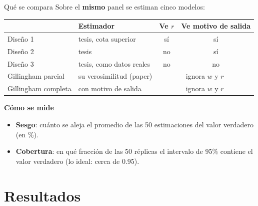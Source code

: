 \documentclass[aspectratio=169,11pt]{beamer}
\begin{document}
\begin{frame}{Qué se compara}
  Sobre el \textbf{mismo} panel se estiman cinco modelos:
  \begin{center}
  \begin{tabular}{llcc}
    \toprule
    & Estimador & Ve $r$ & Ve motivo de salida\\
    \midrule
    Diseño 1 & tesis, cota superior & sí & sí\\
    Diseño 2 & tesis & no & sí\\
    Diseño 3 & tesis, como datos reales & no & no\\
    Gillingham parcial & su verosimilitud (paper) & \multicolumn{2}{c}{ignora $w$ y $r$}\\
    Gillingham completa & con motivo de salida & \multicolumn{2}{c}{ignora $w$ y $r$}\\
    \bottomrule
  \end{tabular}
  \end{center}
  \textbf{Cómo se mide}
  \begin{itemize}\small
    \item \textbf{Sesgo}: cuánto se aleja el promedio de las 50 estimaciones del valor
          verdadero (en \%).
    \item \textbf{Cobertura}: en qué fracción de las 50 réplicas el intervalo de 95\%
          contiene el valor verdadero (lo ideal: cerca de 0.95).
  \end{itemize}
\end{frame}

\section{Resultados}
\end{document}
